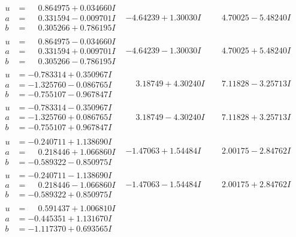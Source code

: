 \documentclass[1p]{elsarticle_modified}
\theoremstyle{definition}
\begin{document}
$$\begin{array}{c|c|c}
\begin{aligned}
u &= \phantom{-}0.864975 + 0.034660 I \\
a &= \phantom{-}0.331594 - 0.009701 I \\
b &= \phantom{-}0.305266 + 0.786195 I\end{aligned}
 & -4.64239 + 1.30030 I & \phantom{-}4.70025 - 5.48240 I \\ \hline\begin{aligned}
u &= \phantom{-}0.864975 - 0.034660 I \\
a &= \phantom{-}0.331594 + 0.009701 I \\
b &= \phantom{-}0.305266 - 0.786195 I\end{aligned}
 & -4.64239 - 1.30030 I & \phantom{-}4.70025 + 5.48240 I \\ \hline\begin{aligned}
u &= -0.783314 + 0.350967 I \\
a &= -1.325760 - 0.086765 I \\
b &= -0.755107 - 0.967847 I\end{aligned}
 & \phantom{-}3.18749 + 4.30240 I & \phantom{-}7.11828 - 3.25713 I \\ \hline\begin{aligned}
u &= -0.783314 - 0.350967 I \\
a &= -1.325760 + 0.086765 I \\
b &= -0.755107 + 0.967847 I\end{aligned}
 & \phantom{-}3.18749 - 4.30240 I & \phantom{-}7.11828 + 3.25713 I \\ \hline\begin{aligned}
u &= -0.240711 + 1.138690 I \\
a &= \phantom{-}0.218446 + 1.066860 I \\
b &= -0.589322 - 0.850975 I\end{aligned}
 & -1.47063 + 1.54484 I & \phantom{-}2.00175 - 2.84762 I \\ \hline\begin{aligned}
u &= -0.240711 - 1.138690 I \\
a &= \phantom{-}0.218446 - 1.066860 I \\
b &= -0.589322 + 0.850975 I\end{aligned}
 & -1.47063 - 1.54484 I & \phantom{-}2.00175 + 2.84762 I \\ \hline\begin{aligned}
u &= \phantom{-}0.591437 + 1.006810 I \\
a &= -0.445351 + 1.131670 I \\
b &= -1.117370 + 0.693565 I\end{aligned}

\end{array}$$
\end{document}
